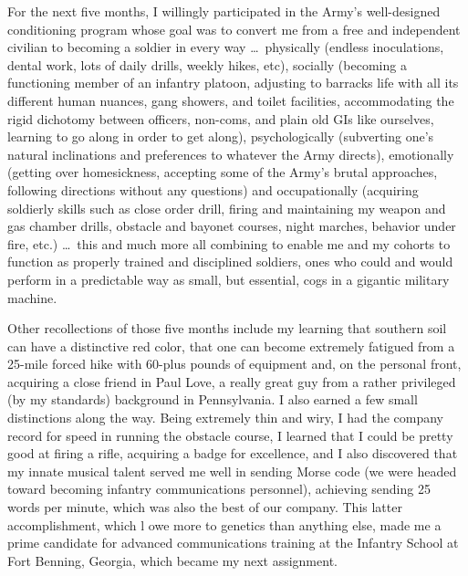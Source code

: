 
For the next five months, I willingly participated in the Army's well-designed conditioning program whose goal was to convert me from a free and independent civilian to becoming a soldier in every way \ldots\ physically (endless inoculations, dental work, lots of daily drills, weekly hikes, etc), socially (becoming a functioning member of an infantry platoon, adjusting to barracks life with all its different human nuances, gang showers, and toilet facilities, accommodating the rigid dichotomy between officers, non-coms, and plain old GIs like ourselves, learning to go along in order to get along), psychologically (subverting one's natural inclinations and preferences to whatever the Army directs), emotionally (getting over homesickness, accepting some of the Army's brutal approaches, following directions without any questions) and occupationally (acquiring soldierly skills such as close order drill, firing and maintaining my weapon and gas chamber drills, obstacle and bayonet courses, night marches, behavior under fire, etc.) \ldots\ this and much more all combining to enable me and my cohorts to function as properly trained and disciplined soldiers, ones who could and would perform in a predictable way as small, but essential, cogs in a gigantic military machine.

Other recollections of those five months include my learning that southern soil can have a distinctive red color, that one can become extremely fatigued from a 25-mile forced hike with 60-plus pounds of equipment and, on the personal front, acquiring a close friend in Paul Love, a really great guy from a rather privileged (by my standards) background in Pennsylvania. I also earned a few small distinctions along the way. Being extremely thin and wiry, I had the company record for speed in running the obstacle course, I learned that I could be pretty good at firing a rifle, acquiring a badge for excellence, and I also discovered that my innate musical talent served me well in sending Morse code (we were headed toward becoming infantry communications personnel), achieving sending 25 words per minute, which was also the best of our company. This latter accomplishment, which l owe more to genetics than anything else, made me a prime candidate for advanced communications training at the Infantry School at Fort Benning, Georgia, which became my next assignment.